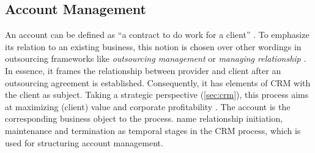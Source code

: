 	
	 
	
	
	\subsection{Account Management}
	
	An account can be defined as \enquote{a contract to do work for a client} \citep{oxfordaccount}. To emphasize its relation to an existing business, this notion is chosen over other wordings in outsourcing frameworks like \textit{outsourcing management} \citep{Franceschini_2003} or \textit{managing relationship} \citep{perunovic2007outsourcing}. In essence, it frames the relationship between provider and client after an outsourcing agreement is established. Consequently, it has elements of \acrshort{CRM} with the client as subject. Taking a strategic perspective (\cf \ref{sec:crm}), this process aims at maximizing (client) value and corporate profitability \citep{payne2004role}. The account is the corresponding business object to the process. \cite{reinartz2004customer} name relationship initiation, maintenance and termination as temporal stages in the \acrshort{CRM} process, which is used for structuring account management.
	

